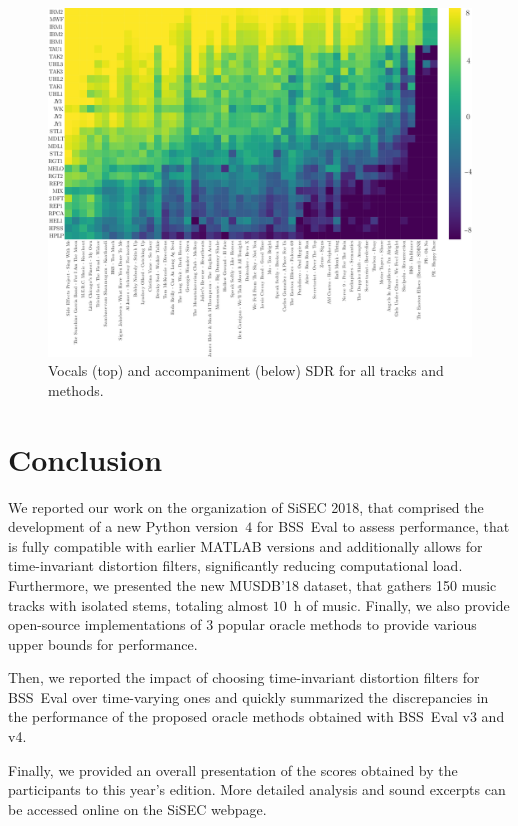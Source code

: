 \documentclass{llncs}
\begin{document}
\begin{figure}
  \begin{center}
     \includegraphics[width=\linewidth]{fig/heatmap_vocals.pdf}
     \vspace{-1cm}
  \end{center}
  \caption{Vocals (top) and accompaniment (below) SDR for all tracks and methods.}
  \label{fig:trackwise_scores}
\end{figure}


\section{Conclusion}
\label{sec:concl}
\vspace{-2mm}
We reported our work on the organization of SiSEC 2018, that comprised the development of a new Python version~$4$ for BSS~Eval to assess performance, that is fully compatible with earlier MATLAB versions and additionally allows for time-invariant distortion filters, significantly reducing computational load. Furthermore, we presented the new MUSDB'18 dataset, that gathers 150 music tracks with isolated stems, totaling almost $10$~h of music. Finally, we also provide open-source implementations of $3$ popular oracle methods to provide various upper bounds for performance.

Then, we reported the impact of choosing time-invariant distortion filters for BSS~Eval over time-varying ones and quickly summarized the discrepancies in the performance of the proposed oracle methods obtained with BSS~Eval v3 and v4.

Finally, we provided an overall presentation of the scores obtained by the participants to this year's edition. More detailed analysis and sound excerpts can be accessed online on the SiSEC webpage.
\footnotesize


\end{document}
